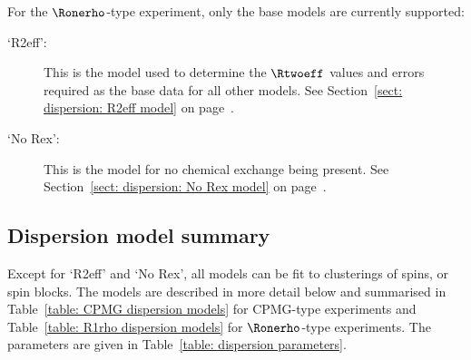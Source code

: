 For the $\Ronerho$-type experiment, only the base models are currently supported:

\begin{description}
\item[`R2eff':]  This is the model used to determine the $\Rtwoeff$ values and errors required as the base data for all other models.  See Section~\ref{sect: dispersion: R2eff model} on page~\pageref{sect: dispersion: R2eff model}.
\item[`No Rex':]  This is the model for no chemical exchange being present.  See Section~\ref{sect: dispersion: No Rex model} on page~\pageref{sect: dispersion: No Rex model}.
\end{description}






\subsection{Dispersion model summary}

Except for `R2eff' and `No Rex', all models can be fit to clusterings of spins, or spin blocks.
The models are described in more detail below and summarised in Table~\ref{table: CPMG dispersion models} for CPMG-type experiments and Table~\ref{table: R1rho dispersion models} for $\Ronerho$-type experiments.
The parameters are given in Table~\ref{table: dispersion parameters}.

